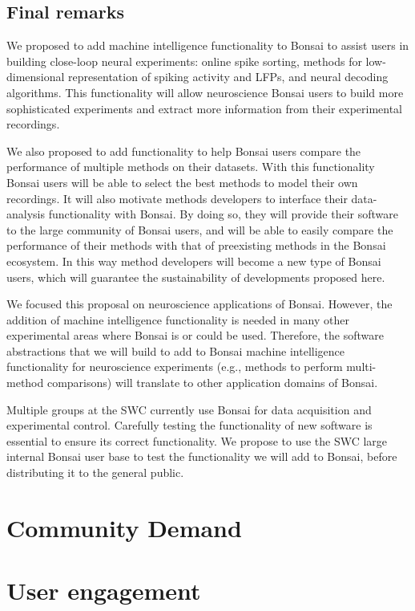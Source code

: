 \documentclass[a4paper,11point]{article}
\begin{document}
\subsection{Final remarks}
\label{sec:finalRemarks}

We proposed to add machine intelligence functionality to Bonsai to assist users
in building close-loop neural experiments: online spike sorting, methods for
low-dimensional representation of spiking activity and LFPs, and neural
decoding algorithms. This functionality will allow neuroscience Bonsai users to
build more sophisticated experiments and extract more information from their
experimental recordings.

We also proposed to add functionality to help Bonsai users compare the
performance of multiple methods on their datasets. With this functionality
Bonsai users will be able to select the best methods to model their own
recordings. It will also motivate methods developers to interface their
data-analysis functionality with Bonsai. By doing so, they will provide their
software to the large community of Bonsai users, and will be able to easily
compare the performance of their methods with that of preexisting methods in the
Bonsai ecosystem. In this way method developers will become a new type of
Bonsai users, which will guarantee the sustainability of developments
proposed here.

We focused this proposal on neuroscience applications of Bonsai. However, the
addition of machine intelligence functionality is needed in many other
experimental areas where Bonsai is or could be used. Therefore, the software
abstractions that we will build to add to Bonsai machine intelligence
functionality for neuroscience experiments (e.g., methods to perform
multi-method comparisons) will translate to other application domains of
Bonsai.

Multiple groups at the SWC currently use Bonsai for data acquisition and
experimental control. Carefully testing the functionality of new software is
essential to ensure its correct functionality. We propose to use the SWC large
internal Bonsai user base to test the functionality we will add to Bonsai,
before distributing it to the general public.

\section{Community Demand}

\section{User engagement}
\end{document}
